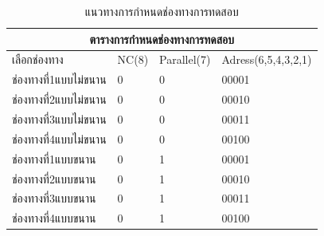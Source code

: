 \begin{table}[H]
\caption{แนวทางการกำหนดช่องทางการทดสอบ}
\centering
\begin{tabular}{ |p{5cm}||p{1cm}||p{2.5cm}||p{3cm}|  }
 \hline
 \multicolumn{4}{|c|}{ตารางการกำหนดช่องทางการทดสอบ} \\
 \hline
 เลือกช่องทาง &NC(8) & Parallel(7) & Adress(6,5,4,3,2,1)\\
 \hline
 ช่องทางที่1แบบไม่ขนาน &0 & 0& 00001\\
 ช่องทางที่2แบบไม่ขนาน &0 & 0& 00010\\
 ช่องทางที่3แบบไม่ขนาน &0 & 0& 00011\\
 ช่องทางที่4แบบไม่ขนาน &0 & 0& 00100\\
 \hline
 ช่องทางที่1แบบขนาน &0 & 1& 00001\\
 ช่องทางที่2แบบขนาน &0 & 1& 00010\\
 ช่องทางที่3แบบขนาน &0 & 1& 00011\\
 ช่องทางที่4แบบขนาน &0 & 1& 00100\\
 \hline
 \end{tabular}
\label{tab:select_table}
\end{table}

